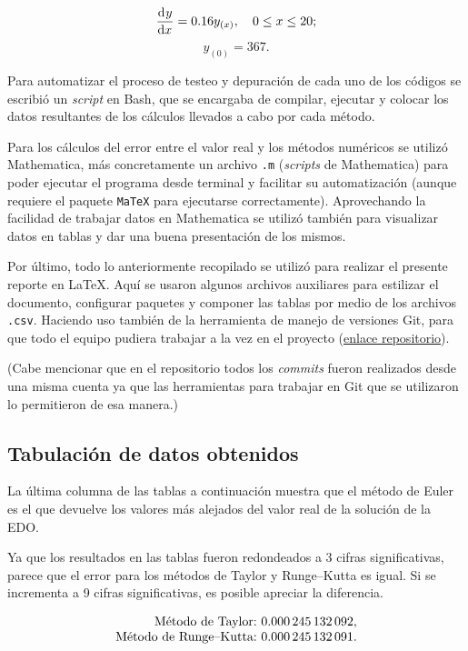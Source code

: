 \documentclass[
    english, spanish, Ce-table, Ce-theorem
]{CabesHW}
\begin{document}
\[ \td{y}{x} = 0.16y_{(x)}, \quad 0\leq x\leq 20;\] 
\[ y_{(0)} = 367. \]

Para automatizar el proceso de testeo y depuración de cada uno de los códigos se escribió un \textit{script} en Bash, que se encargaba de compilar, ejecutar y colocar los datos resultantes de los cálculos llevados a cabo por cada método.

Para los cálculos del error entre el valor real y los métodos numéricos se utilizó Mathematica, más concretamente un archivo \texttt{.m} (\textit{scripts} de Mathematica) para poder ejecutar el programa desde terminal y facilitar su automatización (aunque requiere el paquete \texttt{MaTeX} para ejecutarse correctamente). Aprovechando la facilidad de trabajar datos en Mathematica se utilizó también para visualizar datos en tablas y dar una buena presentación de los mismos.

Por último, todo lo anteriormente recopilado se utilizó para realizar el presente reporte en \LaTeX{}. Aquí se usaron algunos archivos auxiliares para estilizar el documento, configurar paquetes y componer las tablas por medio de los archivos \texttt{.csv}. Haciendo uso también de la herramienta de manejo de versiones Git, para que todo el equipo pudiera trabajar a la vez en el proyecto (\href{https://github.com/AmadoCab/Proyecto4LabSimu}{\sffamily enlace repositorio}).

(Cabe mencionar que en el repositorio todos los \textit{commits} fueron realizados desde una misma cuenta ya que las herramientas para trabajar en Git que se utilizaron lo permitieron de esa manera.)

\vspace{0.5em}
\subsection{Tabulación de datos obtenidos}
La última columna de las tablas a continuación muestra que el método de Euler es el que devuelve los valores más alejados del valor real de la solución de la EDO.

Ya que los resultados en las tablas fueron redondeados a 3 cifras significativas, parece que el error para los métodos de Taylor y Runge--Kutta es igual. Si se incrementa a 9 cifras significativas, es posible apreciar la diferencia.

\[ 
\begin{array}{r@{\ }l}
\text{Método de Taylor:}& \num{0.000 245 132 092},\\
\text{Método de Runge--Kutta:}& \num{0.000 245 132 091}.
\end{array}
\]
\end{document}
